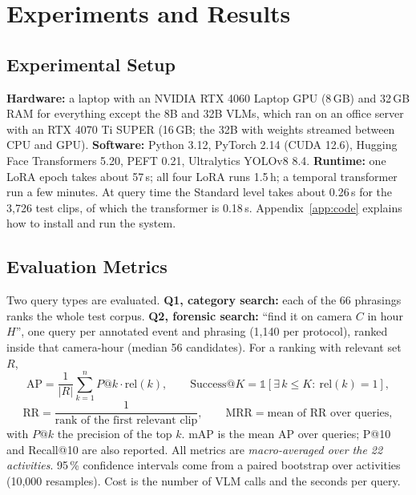 \documentclass[11pt,a4paper]{article}
\begin{document}
\section{Experiments and Results}\label{sec:exp}

\subsection{Experimental Setup}
\textbf{Hardware:} a laptop with an NVIDIA RTX 4060 Laptop GPU (8\,GB) and 32\,GB RAM for everything except the 8B
and 32B VLMs, which ran on an office server with an RTX 4070 Ti SUPER (16\,GB; the 32B with weights streamed
between CPU and GPU). \textbf{Software:} Python 3.12, PyTorch 2.14 (CUDA 12.6), Hugging Face Transformers 5.20,
PEFT 0.21, Ultralytics YOLOv8 8.4. \textbf{Runtime:} one LoRA epoch takes about 57\,s; all four LoRA runs 1.5\,h;
a temporal transformer run a few minutes. At query time the Standard level takes about 0.26\,s for the 3,726 test
clips, of which the transformer is 0.18\,s. Appendix~\ref{app:code} explains how to install and run the
system.

\subsection{Evaluation Metrics}
Two query types are evaluated. \textbf{Q1, category search:} each of the 66 phrasings ranks the whole test corpus.
\textbf{Q2, forensic search:} ``find it on camera $C$ in hour $H$'', one query per annotated event and phrasing
(1,140 per protocol), ranked inside that camera-hour (median 56 candidates). For a ranking with relevant set $R$,
\begin{equation}
\mathrm{AP} = \frac{1}{|R|}\sum_{k=1}^{n} P@k \cdot \mathrm{rel}(k),\qquad
\mathrm{Success@}K = \mathbb{1}\!\left[\exists\, k \le K:\ \mathrm{rel}(k)=1\right],
\end{equation}
\begin{equation}
\mathrm{RR} = \frac{1}{\text{rank of the first relevant clip}}, \qquad \mathrm{MRR} = \text{mean of RR over queries},
\end{equation}
with $P@k$ the precision of the top $k$. mAP is the mean AP over queries; P@10 and Recall@10 are also reported.
All metrics are \emph{macro-averaged over the 22 activities}. 95\,\% confidence intervals come from a paired
bootstrap over activities (10,000 resamples). Cost is the number of VLM calls and the seconds per query.
\end{document}

